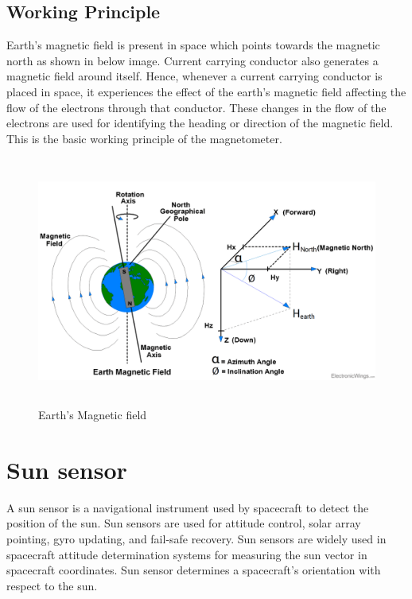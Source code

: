 \subsection{Working Principle}

Earth’s magnetic field is present in space which points towards the magnetic north as shown in below image. Current carrying conductor also generates a magnetic field around itself. Hence, whenever a current carrying conductor is placed in space, it experiences the effect of the earth’s magnetic field affecting the flow of the electrons through that conductor. These changes in the flow of the electrons are used for identifying the heading or direction of the magnetic field. This is the basic working principle of the magnetometer.

\begin{figure}[h!]
	\centering
	\includegraphics[width=5.5in,height=3.22in]{./images/earthmf.png}
	\caption{Earth's Magnetic field}
	\label{earthmfimg}
\end{figure}

\section{Sun sensor}

A sun sensor is a navigational instrument used by spacecraft to detect the position of the sun. Sun sensors are used for attitude control, solar array pointing, gyro updating, and fail-safe recovery. Sun sensors are widely used in spacecraft attitude determination systems for measuring the sun vector in spacecraft coordinates. Sun sensor determines a spacecraft’s orientation with respect to the sun.

